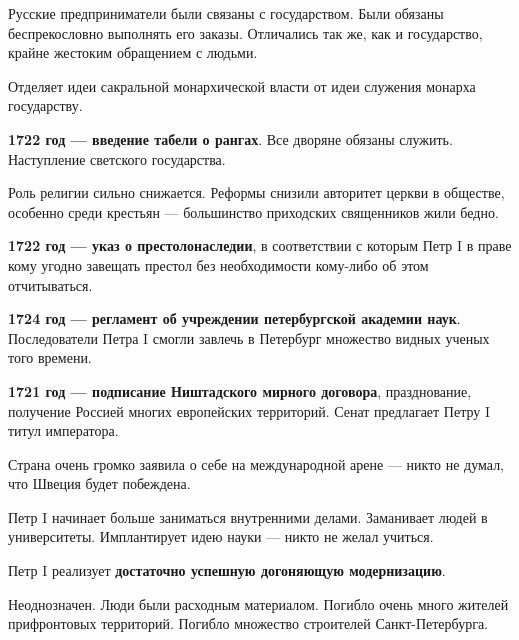 \documentclass{article}
\begin{document}
Русские предприниматели были связаны с государством. Были обязаны беспрекословно выполнять его заказы. Отличались так же, как и государство, крайне жестоким обращением с людьми.

Отделяет идеи сакральной монархической власти от идеи служения монарха государству.

\textbf{1722 год — введение табели о рангах}. Все дворяне обязаны служить. Наступление светского государства.

\hfill

Роль религии сильно снижается. Реформы снизили авторитет церкви в обществе, особенно среди крестьян — большинство приходских священников жили бедно.

\textbf{1722 год — указ о престолонаследии}, в соответствии с которым Петр I в праве кому угодно завещать престол без необходимости кому-либо об этом отчитываться.

\textbf{1724 год — регламент об учреждении петербургской академии наук}. Последователи Петра I смогли завлечь в Петербург множество видных ученых того времени.

\hfill

\textbf{1721 год — подписание Ништадского мирного договора}, празднование, получение Россией многих европейских территорий. Сенат предлагает Петру I титул императора.

Страна очень громко заявила о себе на международной арене — никто не думал, что Швеция будет побеждена.

Петр I начинает больше заниматься внутренними делами. Заманивает людей в университеты. Имплантирует идею науки — никто не желал учиться.

\hfill

Петр I реализует \textbf{достаточно успешную догоняющую модернизацию}. 

\hfill

Неоднозначен. Люди были расходным материалом. Погибло очень много жителей прифронтовых территорий. Погибло множество строителей Санкт-Петербурга.
\end{document}
